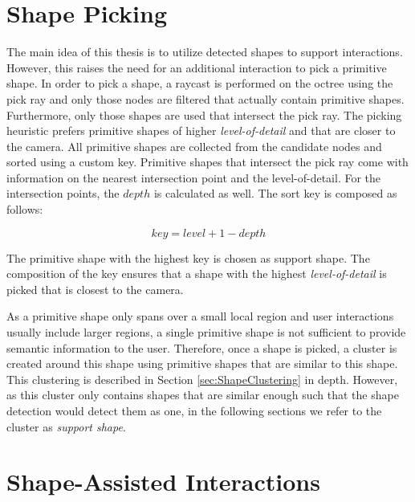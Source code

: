 \section{Shape Picking}
\label{sec:shapePicking}

The main idea of this thesis is to utilize detected shapes to support interactions. However, this raises the need for an additional interaction to pick a primitive shape. In order to pick a shape, a raycast is performed on the octree using the pick ray and only those nodes are filtered that actually contain primitive shapes. Furthermore, only those shapes are used that intersect the pick ray. The picking heuristic prefers primitive shapes of higher \textit{level-of-detail} and that are closer to the camera. All primitive shapes are collected from the candidate nodes and sorted using a custom key. Primitive shapes that intersect the pick ray come with information on the nearest intersection point and the level-of-detail. For the intersection points, the $depth$ is calculated as well. The sort key is composed as follows: 

$$key = level + 1 - depth$$

The primitive shape with the highest key is chosen as support shape. The composition of the key ensures that a shape with the highest \textit{level-of-detail} is picked that is closest to the camera.

As a primitive shape only spans over a small local region and user interactions usually include larger regions, a single primitive shape is not sufficient to provide semantic information to the user. Therefore, once a shape is picked, a cluster is created around this shape using primitive shapes that are similar to this shape. This clustering is described in Section \ref{sec:ShapeClustering} in depth. However, as this cluster only contains shapes that are similar enough such that the shape detection would detect them as one, in the following sections we refer to the cluster as \textit{support shape}. 


\section{Shape-Assisted Interactions}
\label{sec:interactions}

